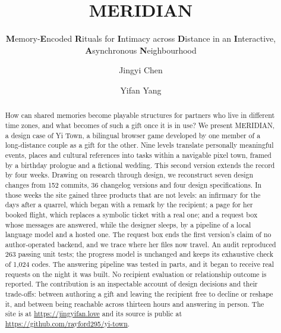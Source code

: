 \documentclass[sigconf,nonacm]{acmart}
\DeclareRobustCommand{\redheart}{\usebox{\heartbox}}
\DeclareRobustCommand{\ini}[1]{\textcolor{merred}{\textbf{#1}}}
\begin{document}
\title[MERIDIAN]{\texorpdfstring{\textcolor{merred}{MERIDIAN}\hspace{0.18em}\redheart}{MERIDIAN}}
\subtitle{\ini{M}emory-\ini{E}ncoded \ini{R}ituals for \ini{I}ntimacy across \ini{D}istance
in an \ini{I}nteractive, \ini{A}synchronous \ini{N}eighbourhood}

\author{Jingyi Chen}

\author{Yifan Yang}

\renewcommand{\shortauthors}{J. Chen and Y. Yang}


\begin{abstract}
How can shared memories become playable structures for partners who live in different time zones,
and what becomes of such a gift once it is in use? We present MERIDIAN, a design case of Yi Town,
a bilingual browser game developed by one member of a long-distance couple as a gift for the
other. Nine levels translate personally meaningful events, places and cultural references into
tasks within a navigable pixel town, framed by a birthday prologue and a fictional wedding. This
second version extends the record by four weeks. Drawing on research through design, we
reconstruct seven design changes from 152 commits, 36 changelog versions and four design
specifications. In those weeks the site gained three products that are not levels: an infirmary
for the days after a quarrel, which began with a remark by the recipient; a page for her booked
flight, which replaces a symbolic ticket with a real one; and a request box whose messages are
answered, while the designer sleeps, by a pipeline of a local language model and a hosted one.
The request box ends the first version's claim of no author-operated backend, and we trace where
her files now travel. An audit reproduced 263 passing unit tests; the progress model is unchanged
and keeps its exhaustive check of 1,024 codes. The answering pipeline was tested in parts, and it began to receive real
requests on the night it was built. No recipient evaluation or relationship outcome
is reported. The contribution is an inspectable account of design decisions and their trade-offs:
between authoring a gift and leaving the recipient free to decline or reshape it, and between
being reachable across thirteen hours and answering in person. The site is at
\url{https://jingyifan.love} and its source is public at \url{https://github.com/rayford295/yi-town}.

\end{abstract}
\end{document}
